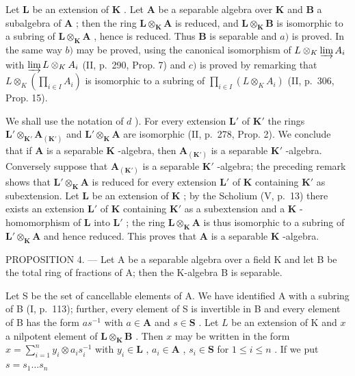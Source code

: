 Let \(\mathbf{L}\) be an extension of \(\mathbf{K}\) . Let \(\mathbf{A}\) be a separable algebra over \(\mathbf{K}\) and \(\mathbf{B}\) a subalgebra of \(\mathbf{A}\) ; then the ring \(\mathbf{L} \otimes_{\mathbf{K}} \mathbf{A}\) is reduced, and \(\mathbf{L} \otimes_{\mathbf{K}} \mathbf{B}\) is isomorphic to a subring of \(\mathbf{L} \otimes_{\mathbf{K}} \mathbf{A}\) , hence is reduced. Thus \(\mathbf{B}\) is separable and \(a)\) is proved. In the same way \(b)\) may be proved, using the canonical isomorphism of \(L \otimes_{K} \varinjlim A_i\) with \(\varinjlim L \otimes_K A_i\) (II, p.~290, Prop. 7) and \(c)\) is proved by remarking that \(L \otimes_K \left( \prod_{i \in I} A_i \right)\) is isomorphic to a subring of \(\prod_{i \in I} (L \otimes_K A_i)\) (II, p.~306, Prop. 15).

We shall use the notation of \(d\) ). For every extension \(\mathbf{L}'\) of \(\mathbf{K}'\) the rings \(\mathbf{L}' \otimes_{\mathbf{K}'} \mathbf{A}_{(\mathbf{K}')}\) and \(\mathbf{L}' \otimes_{\mathbf{K}} \mathbf{A}\) are isomorphic (II, p.~278, Prop. 2). We conclude that if \(\mathbf{A}\) is a separable \(\mathbf{K}\) -algebra, then \(\mathbf{A}_{(\mathbf{K}')}\) is a separable \(\mathbf{K}'\) -algebra. Conversely suppose that \(\mathbf{A}_{(\mathbf{K}')}\) is a separable \(\mathbf{K}'\) -algebra; the preceding remark shows that \(\mathbf{L}' \otimes_{\mathbf{K}} \mathbf{A}\) is reduced for every extension \(\mathbf{L}'\) of \(\mathbf{K}\) containing \(\mathbf{K}'\) as subextension. Let \(\mathbf{L}\) be an extension of \(\mathbf{K}\) ; by the Scholium (V, p.~13) there exists an extension \(\mathbf{L}'\) of \(\mathbf{K}\) containing \(\mathbf{K}'\) as a subextension and a \(\mathbf{K}\) -homomorphism of \(\mathbf{L}\) into \(\mathbf{L}'\) ; the ring \(\mathbf{L} \otimes_{\mathbf{K}} \mathbf{A}\) is thus isomorphic to a subring of \(\mathbf{L}' \otimes_{\mathbf{K}} \mathbf{A}\) and hence reduced. This proves that \(\mathbf{A}\) is a separable \(\mathbf{K}\) -algebra.

PROPOSITION 4. --- Let A be a separable algebra over a field K and let B be the total ring of fractions of A; then the K-algebra B is separable.

Let S be the set of cancellable elements of A. We have identified A with a subring of B (I, p.~113); further, every element of S is invertible in B and every element of B has the form \(as^{-1}\) with \(a \in \mathbf{A}\) and \(s \in \mathbf{S}\) . Let \(L\) be an extension of K and \(x\) a nilpotent element of \(\mathbf{L} \otimes_{\mathbf{K}} \mathbf{B}\) . Then \(x\) may be written in the form \(x = \sum_{i=1}^{n} y_i \otimes a_i s_i^{-1}\) with \(y_i \in \mathbf{L}\) , \(a_i \in \mathbf{A}\) , \(s_i \in \mathbf{S}\) for \(1 \leqslant i \leqslant n\) . If we put \(s = s_1 \ldots s_n\)

